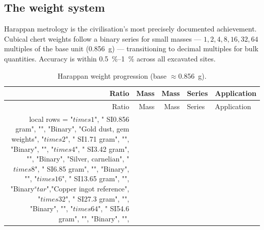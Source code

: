 \subsection{The weight system}

Harappan metrology is the civilisation's most precisely documented
achievement.\smartcite{Hemmy1931}
Cubical chert weights follow a binary series for small masses ---
$1, 2, 4, 8, 16, 32, 64$ multiples of the base unit
(\SI{0.856}{\gram}) --- transitioning to decimal multiples for
bulk quantities.
Accuracy is within \SIrange{0.5}{1}{\percent} across all excavated
sites.\smartcite{Kenoyer2010}

\begin{longtable}{@{}rrrll@{}}
\caption{Harappan weight progression (base $\approx$\SI{0.856}{\gram}).}
\label{tab:weights}\\
\toprule
Ratio & Mass & Mass & Series & Application \\
\midrule
\endfirsthead
\toprule
Ratio & Mass & Mass & Series & Application \\
\midrule
\endhead
\bottomrule
\endlastfoot
\directlua{
local rows = {
  {"$\\times 1$",   "\\SI{0.856}{\\gram}", "",                  "Binary",         "Gold dust, gem weights"},
  {"$\\times 2$",   "\\SI{1.71}{\\gram}",  "",                  "Binary",         ""},
  {"$\\times 4$",   "\\SI{3.42}{\\gram}",  "",                  "Binary",         "Silver, carnelian"},
  {"$\\times 8$",   "\\SI{6.85}{\\gram}",  "",                  "Binary",         ""},
  {"$\\times 16$",  "\\SI{13.65}{\\gram}", "",                  "Binary$^\\star$","Copper ingot reference"},
  {"$\\times 32$",  "\\SI{27.3}{\\gram}",  "",                  "Binary",         ""},
  {"$\\times 64$",  "\\SI{54.6}{\\gram}",  "",                  "Binary",         ""},
}}
\end{longtable}
